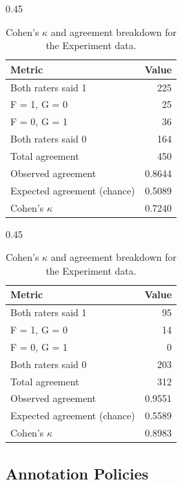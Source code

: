\documentclass[conference]{IEEEtran}
\begin{document}
\begin{table}[ht]
  \begin{subtable}[t]{0.45\linewidth}
    \centering
    \caption{Explicit Inter-sentential Annotation}
    \begin{tabular}{lr}
      \toprule
      Metric & Value \\
      \midrule
      Both raters said 1 & 225 \\
      F = 1, G = 0      & 25  \\
      F = 0, G = 1      & 36  \\
      Both raters said 0 & 164 \\
      \midrule
      Total agreement            & 450    \\
      Observed agreement         & 0.8644 \\
      Expected agreement (chance)& 0.5089 \\
      Cohen's $\kappa$           & 0.7240 \\
      \bottomrule
    \end{tabular}
  \end{subtable}\hfill
  \begin{subtable}[t]{0.45\linewidth}
    \centering
    \caption{Implicit Inter-sentential Annotation}
    \begin{tabular}{lr}
      \toprule
      Metric & Value \\
      \midrule
      Both raters said 1 & 95  \\
      F = 1, G = 0      & 14  \\
      F = 0, G = 1      & 0   \\
      Both raters said 0 & 203 \\
      \midrule
      Total agreement            & 312    \\
      Observed agreement         & 0.9551 \\
      Expected agreement (chance)& 0.5589 \\
      Cohen's $\kappa$           & 0.8983 \\
      \bottomrule
    \end{tabular}
  \end{subtable}

  \caption{Cohen's $\kappa$ and agreement breakdown for the Experiment data.}
  \label{app:tab:cohen_kappa_subtables}
\end{table}


\subsection{Annotation Policies} \label{app:Annotation_Policies}
\end{document}
